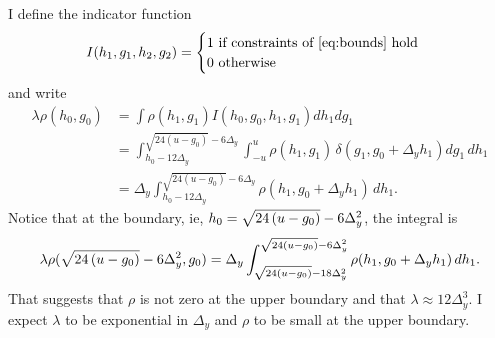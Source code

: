 \documentclass[]{article}
\begin{document}
I define the indicator function
\begin{equation*}
  I(h_1, g_1, h_2, g_2) =
  \begin{cases}
    1 \text{ if constraints of \eqref{eq:bounds} hold} \\
    0 \text{ otherwise}
  \end{cases}
\end{equation*}
and write
\renewcommand{\RANGE}{_{h_0 - 12 \Delta_y}^{\sqrt{24(u-g_0)} - 6 \Delta_y}}
\begin{align}
  \lambda \rho(h_0,g_0) &= \int \rho(h_1, g_1) I( h_0, g_0, h_1, g_1)
  d h_1 d g_1 \nonumber \\
  &= \int\RANGE \int_{-u}^u \rho(h_1, g_1) \, \delta(g_1,g_0 +
  \Delta_y h_1) d g_1 \, dh_1 \nonumber \\
  \label{eq:Int}
  &= \Delta_y \int\RANGE \rho(h_1, g_0 + \Delta_y h_1) \, dh_1 .
\end{align}
Notice that at the boundary, ie, $h_0 = \sqrt{24\left(u-g_0\right)} - 6\Delta_y^2$, the
integral is
\begin{equation*}
  \lambda \rho(\sqrt{24\left(u-g_0\right)} - 6\Delta_y^2,g_0) = \Delta_y
  \int_{\sqrt{24\left(u-g_0\right)} - 18\Delta_y^2} ^{\sqrt{24\left(u-g_0\right)} - 6\Delta_y^2}
  \rho(h_1, g_0 + \Delta_y h_1) \, dh_1.
\end{equation*}
That suggests that $\rho$ is not zero at the upper boundary and that
$\lambda \approx 12 \Delta^3_y$.   I expect
$\lambda$ to be exponential in $\Delta_y$ and $\rho$ to be small at
the upper boundary.
\end{document}
